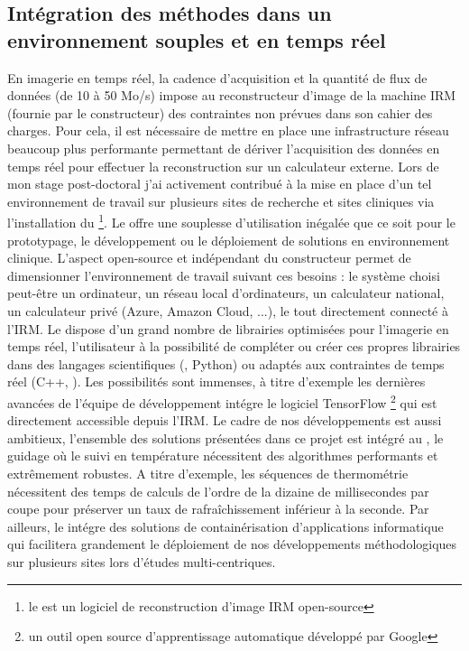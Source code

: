 \documentclass[10pt,a4paper]{report}
\begin{document}
\subsection{Intégration des méthodes dans un environnement souples et en temps réel}

En imagerie en temps réel, la cadence d’acquisition et la quantité de flux de données (de 10 à 50 Mo/s) impose au reconstructeur d’image de la machine IRM (fournie par le constructeur) des contraintes non prévues dans son cahier des charges. Pour cela, il est nécessaire de mettre en place une infrastructure réseau beaucoup plus performante permettant de dériver l’acquisition des données en temps réel pour effectuer la reconstruction sur un calculateur externe. Lors de mon stage post-doctoral j’ai activement contribué à la mise en place d’un tel environnement de travail sur plusieurs sites de recherche et sites cliniques via l’installation du \GADGETRON\footnote{le \GADGETRON est un logiciel de reconstruction d’image IRM open-source}. Le \GADGETRON offre une souplesse d’utilisation inégalée que ce soit pour le prototypage, le développement ou le déploiement de solutions en environnement clinique. L’aspect open-source et indépendant du constructeur permet de dimensionner l’environnement de travail suivant ces besoins : le système choisi peut-être un ordinateur, un réseau local d’ordinateurs, un calculateur national, un calculateur privé (Azure, Amazon Cloud, ...), le tout directement connecté à l’IRM. Le \GADGETRON dispose d’un grand nombre de librairies optimisées pour l’imagerie en temps réel, l’utilisateur à la possibilité de compléter ou créer ces propres librairies dans des langages scientifiques (\MATLAB, Python) ou adaptés aux contraintes de temps réel (C++, \CUDA). Les possibilités sont immenses, à titre d’exemple les dernières avancées de l’équipe de développement intégre le logiciel TensorFlow \footnote{un outil open source d’apprentissage automatique développé par Google} qui est directement accessible depuis l’IRM. Le cadre de nos développements est aussi ambitieux, l’ensemble des solutions présentées dans ce projet est intégré au \GADGETRON, le guidage où le suivi en température nécessitent des algorithmes performants et extrêmement robustes. A titre d’exemple, les séquences de thermométrie nécessitent des temps de calculs de l’ordre de la dizaine de millisecondes par coupe pour préserver un taux de rafraîchissement inférieur à la seconde. Par ailleurs, le \GADGETRON intégre des solutions de containérisation d’applications informatique qui facilitera grandement le déploiement de nos développements méthodologiques sur plusieurs sites lors d’études multi-centriques\cite{de2024fully,de2024advanced}.\\
\end{document}
